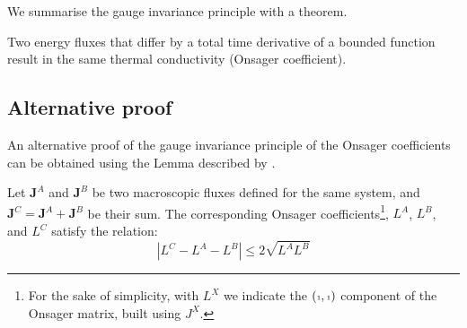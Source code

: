 We summarise the gauge invariance principle with a theorem.
\begin{theorem} \label{th:gauge-invariance}
Two energy fluxes that differ by a total time derivative of a bounded function result in the same thermal conductivity (Onsager coefficient).
\end{theorem}


\subsection{Alternative proof}  \label{sec:gauge-proof}
An alternative proof of the gauge invariance principle of the Onsager coefficients can be obtained using the Lemma described by \textcite{Marcolongo2016}.

\begin{lemma} \label{th:aris-theorem}
Let $\mathbf{J}^A$ and $\mathbf{J}^B$ be two macroscopic fluxes defined for the same system, and  $\mathbf{J}^{C} = \mathbf{J}^A + \mathbf{J}^B$ be their sum. The corresponding Onsager coefficients\footnote{For the sake of simplicity, with $L^X$ we indicate the $({\scriptscriptstyle 1},{\scriptscriptstyle 1})$ component of the Onsager matrix, built using $J^X$.
}, $L^{A}$, $L^{B}$, and $L^{C}$ satisfy the relation:
\begin{equation} \label{eq:aris-theorem}
    \left| L^{C} - L^{A} - L^{B} \right| \leq 2 \sqrt{L^{A} L^{B}}
\end{equation}
\end{lemma}

